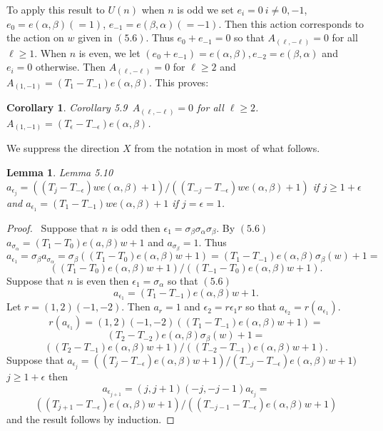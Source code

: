 \documentclass{memo-l}
\newtheorem{lemma}[theorem]{Lemma}
\newtheorem{corollary}[theorem]{Corollary}
\theoremstyle{definition}
\theoremstyle{remark}
\numberwithin{section}{chapter}
\numberwithin{equation}{chapter}
\begin{document}
{\medskip}

   To apply this result to $U(n)$ when $n$ is odd we set $e_{i}  =  0\
   i \ne 
0,-1$, $e_{0}  =  e({\alpha},{\beta}) ( = 1)$, $e_{-1}  =  e({\beta},{\alpha})
( = -1)$.  Then this action corresponds to the action on $w$ given in
$(5.6)$.  Thus $e_{0}+e_{-1} = 0$ so that $A_{({\ell},-{\ell})}  =  0$ for all
${\ell} \ge  1$.  When $n$ is even, we let $(e_{0}+e_{-1})  = 
e({\alpha},{\beta}), e_{-2}  =  e({\beta},{\alpha})$ and $e_{i}  =  0$
otherwise.  Then $A_{({\ell},-{\ell})}  =  0$ for ${\ell} \ge  2$ and
$A_{(1,-1)}  =  (T_{1}-T_{-1})e({\alpha},{\beta})$.  This proves:


\begin{corollary}{Corollary 5.9}\ $A_{(\ell,-\ell)} = 0$ for all
${\ell} \ge  2$.  $A_{(1,-1)}  = 
(T_{{\epsilon}}-T_{-{\epsilon}})e({\alpha},{\beta})$.
\end{corollary}

{\medskip}

We suppress the direction $X$ from the notation in most of what follows.

\begin{lemma}{Lemma 5.10}\ $a_{{\epsilon}_{j}}  = 
((T_{j}-T_{-{\epsilon}})we({\alpha},{\beta})+1)/((T_{-j}-T_{-{\epsilon}})we({\alpha},{\beta})+1)$
if $j \ge  1+{\epsilon}$ and $a_{{\epsilon}_{1}}  = 
(T_{1}-T_{-1})we({\alpha},{\beta})+1$ if $j = {\epsilon} = 1$.
\end{lemma}

\begin{proof} \ Suppose that $n$ is odd then ${\epsilon}_{1}  = 
{\sigma}_{{\beta}}{\sigma}_{{\alpha}}{\sigma}_{{\beta}}$.  By $(5.6)$ 
$ a_{{\sigma}_{{\alpha}}} =  (T_{1}-T_{0})e(a,{\beta})w+1$ and 
$a_{{\sigma}_{{\beta}}} = 1$.  Thus
$$
a_{{\epsilon}_{1}} = {\sigma}_{{\beta}}a_{{\sigma}_{{\alpha}}}
 =  {\sigma}_{{\beta}}((T_{1}-T_{0})e({\alpha},{\beta})w+1)  = 
(T_{1}-T_{-1})e({\alpha},{\beta}){\sigma}_{{\beta}}(w) + 1  = 
$$
$$
((T_{1}-T_{0})e({\alpha},{\beta})w+1)/((T_{-1}-T_{0})e({\alpha},{\beta})w+1).
$$
Suppose that $n$ is even then ${\epsilon}_{1}  =  {\sigma}_{{\alpha}}$ so
that $(5.6)$
$$
a_{{\epsilon}_{1}} = (T_{1}-T_{-1})e({\alpha},{\beta})w+1.
$$
Let $r  =  (1,2)(-1,-2)$.  Then $a_{r}  =  1$ and ${\epsilon}_{2}  = 
r{\epsilon}_{1}r$ so that $a_{{\epsilon}_{2}} =  r(a_{{\epsilon}_{1}})$.
$$
r(a_{{\epsilon}_{1}})  = 
(1,2)(-1,-2)((T_{1}-T_{-1})e({\alpha},{\beta})w+1)  = 
$$
$$
(T_{2}-T_{-2})e({\alpha},{\beta}){\sigma}_{{\beta}}(w)+1  = 
$$
$$
((T_{2}-T_{-1})e({\alpha},{\beta})w+1)/((T_{-2}-T_{-1})e({\alpha},{\beta})w+1).
$$
Suppose that $a_{{\epsilon}_{j}}  = 
((T_{j}-T_{-{\epsilon}})e({\alpha},{\beta})w+1)/(T_{-j}-T_{-{\epsilon}})e({\alpha},{\beta})w+1)$
$ j \ge  1+{\epsilon}$ then
$$
a_{{\epsilon}_{j+1}}  =  (j,j+1)(-j,-j-1)a_{{\epsilon}_{j}}  = 
$$
$$
((T_{j+1}-T_{-{\epsilon}})e({\alpha}, 
{\beta})w+1)/((T_{-j-1}-T_{-{\epsilon}})e({\alpha},{\beta})w+1)
$$
and the result follows by induction.
\end{proof} 
\end{document}
